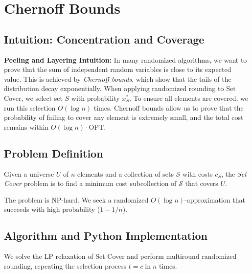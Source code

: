 \setcounter{chapter}{16}
\chapter{Chernoff Bounds}
\label{ch:chernoff_bounds}

\section{Intuition: Concentration and Coverage}

\begin{intuitionbox}
\textbf{Peeling and Layering Intuition:} In many randomized algorithms, we want to prove that the sum of independent random variables is close to its expected value. This is achieved by \emph{Chernoff bounds}, which show that the tails of the distribution decay exponentially. When applying randomized rounding to Set Cover, we select set $S$ with probability $x_S^*$. To ensure all elements are covered, we run this selection $O(\log n)$ times. Chernoff bounds allow us to prove that the probability of failing to cover any element is extremely small, and the total cost remains within $O(\log n) \cdot \text{OPT}$.
\end{intuitionbox}

\section{Problem Definition}
Given a universe $U$ of $n$ elements and a collection of sets $\mathcal{S}$ with costs $c_S$, the \emph{Set Cover} problem is to find a minimum cost subcollection of $\mathcal{S}$ that covers $U$.

The problem is NP-hard. We seek a randomized $O(\log n)$-approximation that succeeds with high probability ($1 - 1/n$).

\section{Algorithm and Python Implementation}
We solve the LP relaxation of Set Cover and perform multiround randomized rounding, repeating the selection process $t = c \ln n$ times.

